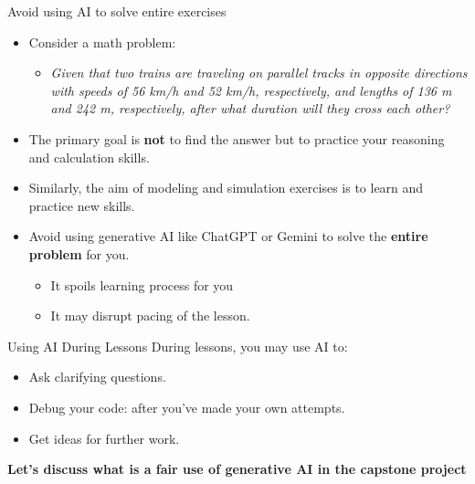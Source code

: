\begin{frame}{Avoid using AI to solve entire exercises}
    \begin{itemize}
        \item Consider a math problem: 
        \begin{itemize}
            \item \textit{Given that two trains are traveling on parallel tracks in opposite directions with speeds of 56 km/h and 52 km/h, respectively, and lengths of 136 m and 242 m, respectively, after what duration will they cross each other?}
        \end{itemize}
        \item The primary goal is \textbf{not} to find the answer but to practice your reasoning and calculation skills.
        \item Similarly,  the aim of modeling and simulation exercises is to learn and practice new skills.
        \item Avoid using generative AI like ChatGPT or Gemini to solve the \textbf{entire problem} for you.      
        \begin{itemize}
            \item It spoils learning process for you
            \item It may disrupt pacing of the lesson. 
        \end{itemize}
    \end{itemize}
\end{frame}


\begin{frame}{Using AI During Lessons} %
\Large 
During lessons, you may use AI to:

\begin{itemize}
    \item Ask clarifying questions. 
    \item Debug your code: after you've made your own attempts. 
    \item Get ideas for further work. 
\end{itemize}

\vspace{0.5cm}  %

\begin{center}
\textbf{Let's discuss what is a fair use of generative AI in the capstone project} 
\end{center}
\end{frame}

